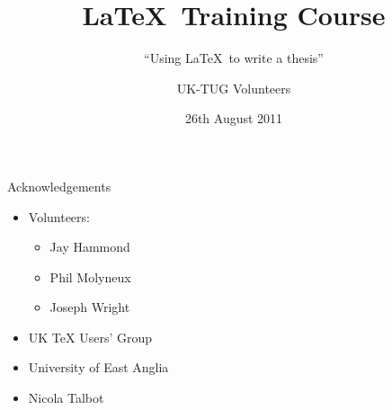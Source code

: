 \usepackage[T1]{fontenc}
\usepackage{babel,booktabs,csquotes,lmodern,tikz,verbatim}

\usetikzlibrary{shapes}

\newcommand*\BibTeX{BibTeX}
\newcommand*\cls[1]{\textsf{#1}}
\newcommand*\cs[1]{\texttt{\char`\\#1}}
\newcommand*\marg[1]{\texttt{\char`\{#1\char`\}}}
\newcommand*\meta[1]{\ensuremath{\langle}\emph{#1}\ensuremath{\rangle}}
\newcommand*\oarg[1]{\texttt{[#1]}}
\newcommand*\pkg[1]{\textsf{#1}}

\renewcommand*\LaTeX{LaTeX}
\renewcommand*\LaTeXe{LaTeX2e}
\renewcommand*\TeX{TeX}

\title{\LaTeX\ Training Course}
\subtitle{\enquote{Using \LaTeX\ to write a thesis}}
\date{26th August 2011}
\author{UK-TUG Volunteers}



\begin{frame}
  \titlepage
\end{frame}



\begin{frame}{Acknowledgements}

  \begin{itemize}
    \item Volunteers:
      \begin{itemize}
        \item Jay Hammond
        \item Phil Molyneux
        \item Joseph Wright
      \end{itemize}
    \item UK TeX Users' Group
    \item University of East Anglia
    \item Nicola Talbot
  \end{itemize}
  
\end{frame}

